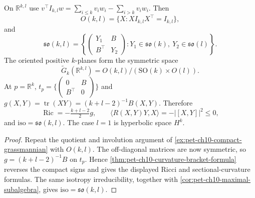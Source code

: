 \begin{example}
  \label{ex:pet-ch10-hyperbolic-grassmannian}
  On $\mathbb R^{k,l}$ use
  $v^\top I_{k,l}w=\sum_{i\le k}v_iw_i-\sum_{i>k}v_iw_i$. Then
  \[
    O(k,l)=\{X:XI_{k,l}X^\top=I_{k,l}\},
  \]
  and
  \[
    \mathfrak{so}(k,l)
    =\left\{\begin{pmatrix}Y_1&B\\B^\top&Y_2\end{pmatrix}:
      Y_1\in\mathfrak{so}(k),\ Y_2\in\mathfrak{so}(l)\right\}.
  \]
  The oriented positive $k$-planes form the symmetric space
  \[
    \widetilde G_k(\mathbb R^{k,l})
      =O(k,l)/(\mathrm{SO}(k)\times O(l)).
  \]
  At $p=\mathbb R^k$,
  $t_p=\{\left(\begin{smallmatrix}0&B\\B^\top&0\end{smallmatrix}\right)\}$ and
  $g(X,Y)=\operatorname{tr}(XY)=(k+l-2)^{-1}B(X,Y)$. Therefore
  \[
    \operatorname{Ric}=-\tfrac{k+l-2}2g,\qquad
    \langle R(X,Y)Y,X\rangle=-|[X,Y]|^2\le0,
  \]
  and $\mathrm{iso}=\mathfrak{so}(k,l)$. The case $l=1$ is hyperbolic space
  $H^k$.
\end{example}
\begin{proof}
  \sketch
  Repeat the quotient and involution argument of
  \cref{ex:pet-ch10-compact-grassmannian} with $O(k,l)$. The off-diagonal
  matrices are now symmetric, so
  $g=(k+l-2)^{-1}B$ on $t_p$. Hence
  \cref{thm:pet-ch10-curvature-bracket-formula} reverses the compact signs and
  gives the displayed Ricci and sectional-curvature formulas. The same
  isotropy irreducibility, together with
  \cref{cor:pet-ch10-maximal-subalgebra}, gives
  $\mathrm{iso}=\mathfrak{so}(k,l)$.
\end{proof}

